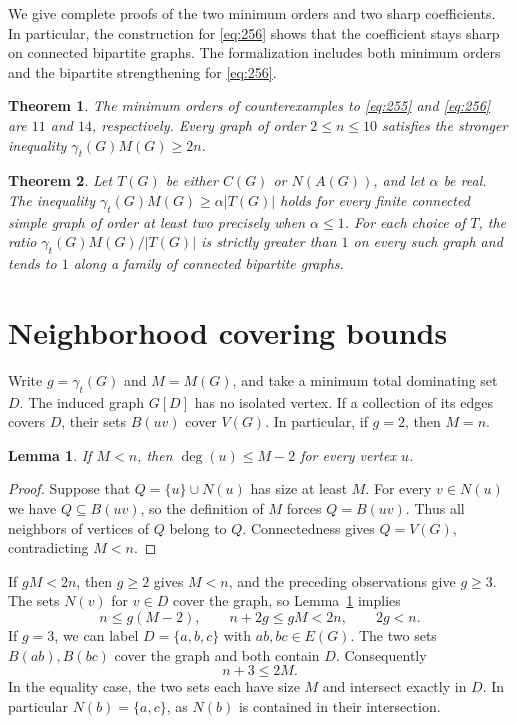 \documentclass[11pt]{article}
\newtheorem{theorem}{Theorem}
\newtheorem{lemma}{Lemma}
\newcommand{\gt}{\gamma_t}
\begin{document}
We give complete proofs of the two minimum orders and two sharp
coefficients. In particular, the construction for \eqref{eq:256}
shows that the coefficient stays sharp on connected bipartite
graphs. The formalization includes both minimum orders and the
bipartite strengthening for \eqref{eq:256}.

\begin{theorem}\label{thm:min}
The minimum orders of counterexamples to \eqref{eq:255} and
\eqref{eq:256} are \(11\) and \(14\), respectively. Every graph
of order \(2\le n\le 10\) satisfies the stronger inequality
\(\gt(G)M(G)\ge 2n\).
\end{theorem}

\begin{theorem}\label{thm:sharp}
Let \(T(G)\) be either \(C(G)\) or \(N(A(G))\), and let \(\alpha\) be real.
The inequality \(\gt(G)M(G)\ge\alpha|T(G)|\) holds for every
finite connected simple graph of order at least two precisely
when \(\alpha\le 1\). For each choice of \(T\), the ratio
\(\gt(G)M(G)/|T(G)|\) is strictly greater than \(1\) on every
such graph and tends to \(1\) along a family of connected
bipartite graphs.
\end{theorem}

\section{Neighborhood covering bounds}

Write \(g=\gt(G)\) and \(M=M(G)\), and take a minimum total dominating
set \(D\). The induced graph \(G[D]\) has no isolated vertex.
If a collection of its edges covers \(D\), their sets \(B(uv)\)
cover \(V(G)\). In particular, if \(g=2\), then \(M=n\).

\begin{lemma}\label{lem:degree}
If \(M<n\), then \(\deg(u)\le M-2\) for every vertex \(u\).
\end{lemma}

\begin{proof}
Suppose that \(Q=\{u\}\cup N(u)\) has size at least \(M\).
For every \(v\in N(u)\) we have \(Q\subseteq B(uv)\), so the
definition of \(M\) forces \(Q=B(uv)\). Thus all neighbors of
vertices of \(Q\) belong to \(Q\). Connectedness gives
\(Q=V(G)\), contradicting \(M<n\).
\end{proof}

If \(gM<2n\), then \(g\ge 2\) gives \(M<n\), and the preceding
observations give \(g\ge 3\). The sets \(N(v)\) for \(v\in D\)
cover the graph, so Lemma~\ref{lem:degree} implies
\begin{equation}\label{eq:cover}
 n\le g(M-2),\qquad n+2g\le gM<2n,\qquad 2g<n.
\end{equation}
If \(g=3\), we can label \(D=\{a,b,c\}\) with \(ab,bc\in E(G)\).
The two sets \(B(ab),B(bc)\) cover the graph and both contain \(D\).
Consequently
\begin{equation}\label{eq:path}
 n+3\le 2M.
\end{equation}
In the equality case, the two sets each have size \(M\) and
intersect exactly in \(D\). In particular \(N(b)=\{a,c\}\),
as \(N(b)\) is contained in their intersection.
\end{document}
